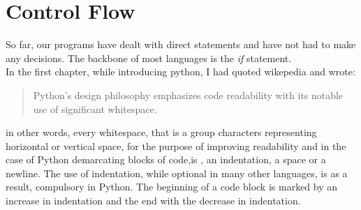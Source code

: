 \chapter{Control Flow}
So far, our programs have dealt with direct statements and have not had to make any decisions. The backbone of most languages is the \emph{if} statement.\\ 
In the first chapter, while introducing python, I had quoted wikepedia and wrote:
\begin{quote}
Python's design philosophy emphasizes code readability with its notable use of significant whitespace.
\end{quote}
in other words, every whitespace, that is a group characters representing horizontal or vertical space, for the purpose of improving readability and in the case of Python demarcating blocks of code,is
, an indentation, a space or a newline. The use of indentation, while optional in many other languages, is as a result, compulsory in Python. 
The beginning of a code block is marked by an increase in indentation and the end with the decrease in indentation.
